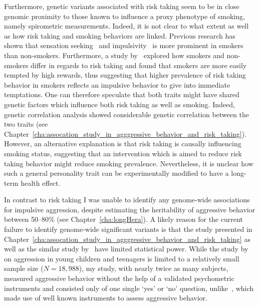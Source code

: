 Furthermore, genetic variants associated with risk taking seem to be in close genomic proximity to those known to influence a proxy phenotype of smoking, namely spirometric measurements.
Indeed, it is not clear to what extent as well as how risk taking and smoking behaviors are linked.
Previous research has shown that sensation seeking~\cite{Carton1994} and impulsivity~\cite{Glicksohn2007,Mitchell1999} is more prominent in smokers than non-smokers.
Furthermore, a study by~\citet{Ert2013} explored how smokers and non-smokers differ in regards to risk taking and found that smokers are more easily tempted by high rewards,
thus suggesting that higher prevalence of risk taking behavior in smokers reflects an impulsive behavior to give into immediate temptations. 
One can therefore speculate that both traits might have shared genetic factors which influence both risk taking as well as smoking.
Indeed, genetic correlation analysis showed considerable genetic correlation between the two traits (see Chapter~\ref{cha:assocation_study_in_agggressive_behavior_and_risk_taking}).
However, an alternative explanation is that risk taking is causally influencing smoking status,
suggesting that an intervention which is aimed to reduce risk taking behavior might reduce smoking prevalence. 
Nevertheless, it is unclear how such a general personality trait can be experimentally modified to have a long-term health effect.

In contrast to risk taking I was unable to identify any genome-wide associations for impulsive aggression, despite estimating the heritability of aggressive behavior between 50--80\% (see Chapter~\ref{cha:longHera}).
A likely reason for the current failure to identify genome-wide significant variants is that the study presented in Chapter~\ref{cha:assocation_study_in_agggressive_behavior_and_risk_taking} as well as the similar study by~\citet{Pappa2016a} have limited statistical power.
While the study by~\cite{Pappa2016a} on aggression in young children and teenagers is limited to a relatively small sample size ($N=18,988$),
my study, with nearly twice as many subjects, measured aggressive behavior without the help of a validated psychometric instruments and consisted only of one single `yes' or `no' question, unlike~\citet{Pappa2016a}, which made use of well known instruments to assess aggressive behavior.

